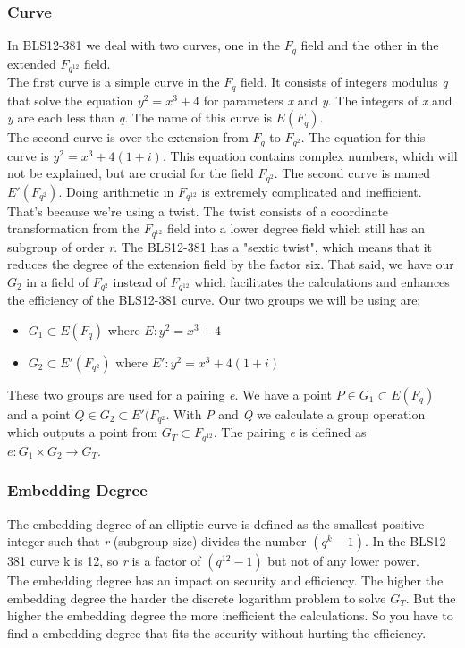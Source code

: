 \documentclass{article}
\begin{document}
\subsubsection{Curve}
In BLS12-381 we deal with two curves, one in the \(F_q\) field and the other in the extended \(F_{q^{12}}\) field. \\
The first curve is a simple curve in the \(F_q\) field. It consists of integers modulus \textit{q} that solve the equation \(y^2 = x^3 + 4\) for parameters \textit{x} and \textit{y}. The integers of \textit{x} and \textit{y} are each less than \textit{q}. The name of this curve is \(E(F_q)\). \\
The second curve is over the extension from \(F_q\) to \(F_{q^2}\). The equation for this curve is \(y^2 = x^3 + 4(1+i)\). This equation contains complex numbers, which will not be explained, but are crucial for the field \(F_{q^2}\). The second curve is named \(E'(F_{q^2})\). Doing arithmetic in \(F_{q^{12}}\) is extremely complicated and inefficient. That's because we're using a twist. The twist consists of a coordinate transformation from the \(F_{q^{12}}\) field into a lower degree field which still has an subgroup of order \textit{r}. The BLS12-381 has a "sextic twist", which means that it reduces the degree of the extension field by the factor six. That said, we have our \(G_2\) in a field of \(F_{q^2}\) instead of \(F_{q^{12}}\) which facilitates the calculations and enhances the efficiency of the BLS12-381 curve. \break
Our two groups we will be using are: \\
\begin{center}
\begin{itemize}
    \item \(G_1 \subset E(F_q)\) where \(E : y^2 = x^3 + 4\)
    \item \(G_2 \subset E'(F_{q^2})\) where \(E' : y^2 = x^3 + 4(1+i)\)
\end{itemize}
\end{center}


These two groups are used for a pairing \textit{e}. We have a point \(P \in G_1 \subset E(F_q) \) and a point \(Q \in G_2 \subset E'(F_{q^2}\). With \textit{P} and \textit{Q} we calculate a group operation which outputs a point from \(G_T \subset F_{q^{12}}\). The pairing \textit{e} is defined as \(e : G_1 \times G_2 \xrightarrow{} G_T\). \cite{bls12-381-hackmd}

\subsubsection{Embedding Degree}
The embedding degree of an elliptic curve is defined as the smallest positive integer such that \textit{r} (subgroup size) divides the number \((q^k -1)\). In the BLS12-381 curve k is 12, so \textit{r} is a factor of \((q^{12} - 1)\) but not of any lower power. \\
The embedding degree has an impact on security and efficiency. The higher the embedding degree the harder the discrete logarithm problem to solve \(G_T\). But the higher the embedding degree the more inefficient the calculations. So you have to find a embedding degree that fits the security without hurting the efficiency. \cite{bls12-381-hackmd}
\end{document}
